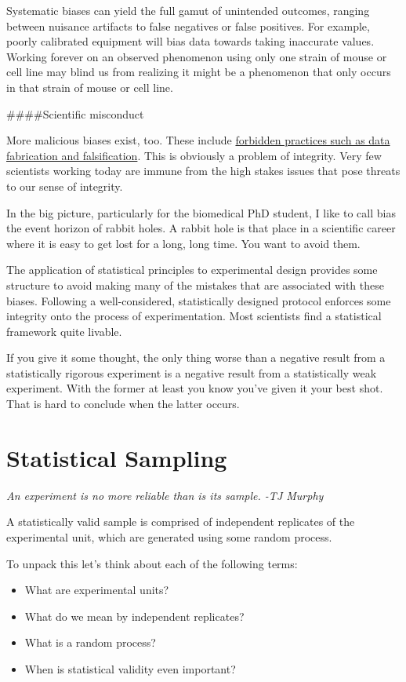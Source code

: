 \documentclass[]{book}
\providecommand{\tightlist}{%
  \setlength{\itemsep}{0pt}\setlength{\parskip}{0pt}}
\begin{document}
Systematic biases can yield the full gamut of unintended outcomes, ranging between nuisance artifacts to false negatives or false positives. For example, poorly calibrated equipment will bias data towards taking inaccurate values. Working forever on an observed phenomenon using only one strain of mouse or cell line may blind us from realizing it might be a phenomenon that only occurs in that strain of mouse or cell line.

\#\#\#\#Scientific misconduct

More malicious biases exist, too. These include \href{https://grants.nih.gov/policy/research_integrity/index.htm}{forbidden practices such as data fabrication and falsification}. This is obviously a problem of integrity. Very few scientists working today are immune from the high stakes issues that pose threats to our sense of integrity.

In the big picture, particularly for the biomedical PhD student, I like to call bias the event horizon of rabbit holes. A rabbit hole is that place in a scientific career where it is easy to get lost for a long, long time. You want to avoid them.

The application of statistical principles to experimental design provides some structure to avoid making many of the mistakes that are associated with these biases. Following a well-considered, statistically designed protocol enforces some integrity onto the process of experimentation. Most scientists find a statistical framework quite livable.

If you give it some thought, the only thing worse than a negative result from a statistically rigorous experiment is a negative result from a statistically weak experiment. With the former at least you know you've given it your best shot. That is hard to conclude when the latter occurs.

\hypertarget{sampling}{%
\chapter{Statistical Sampling}\label{sampling}}

\emph{An experiment is no more reliable than is its sample. -TJ Murphy}

A statistically valid sample is comprised of independent replicates of the experimental unit, which are generated using some random process.

To unpack this let's think about each of the following terms:

\begin{itemize}
\tightlist
\item
  What are experimental units?
\item
  What do we mean by independent replicates?
\item
  What is a random process?
\item
  When is statistical validity even important?
\end{itemize}
\end{document}
